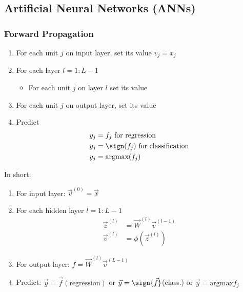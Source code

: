 \documentclass[10pt,a4paper]{scrartcl}
\begin{document}
\begin{multicols*}{2}
\subsection{Artificial Neural Networks (ANNs)}



\subsubsection{Forward Propagation}

\begin{enumerate}
\item For each unit $j$ on input layer, set its value $v_j=x_j$
\item For each layer $l=1:L-1$
\begin{itemize}
\item For each unit $j$ on layer $l$ set its value
\end{itemize}
\item For each unit $j$ on output layer, set its value
\item Predict
\begin{align*}
y_j&=f_j\text{ for regression}\\
y_j&=\sign(f_j)\text{ for classification}\\
y_j&=\text{argmax}(f_j)
\end{align*}
\end{enumerate}

In short:

\begin{enumerate}
\item For input layer: $\vec{v}^{(0)}=\vec{x}$
\item For each hidden layer $l=1:L-1$
\begin{align*}
\vec{z}^{(l)}&=\vec{W}^{(l)}\vec{v}^{(l-1)}\\
\vec{v}^{(l)}&=\phi\left(\vec{z}^{(l)}\right)
\end{align*}
\item For output layer: $f=\vec{W}^{(l)}\vec{v}^{(L-1)}$
\item Predict: $\vec{y}=\vec{f}(\text{regression})$ or $\vec{y} = \sign{\vec{f}}$(class.) or $\vec{y}=\text{argmax} f_j$
\end{enumerate}


\end{multicols*}
\end{document}
